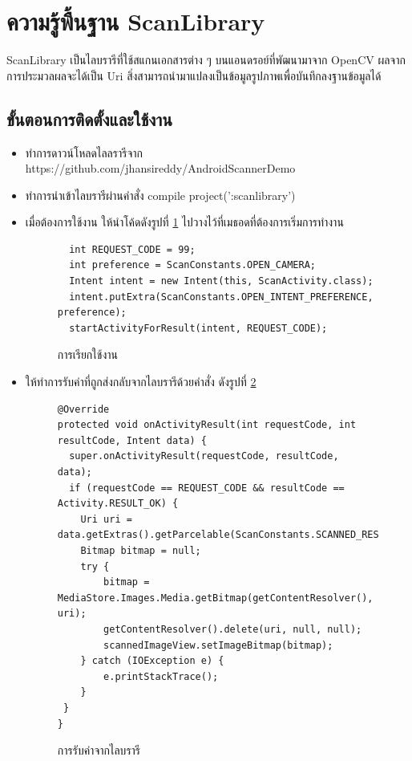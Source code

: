     \section{ความรู้พื้นฐาน ScanLibrary}
	    ScanLibrary \cite{ScanLibrary} เป็นไลบรารีที่ใช้สแกนเอกสารต่าง ๆ บนแอนดรอย์ที่พัฒนามาจาก OpenCV ผลจากการประมวลผลจะได้เป็น Uri สิ่งสามารถนำมาแปลงเป็นข้อมูลรูปภาพเพื่อบันทึกลงฐานข้อมูลได้
	    
	    \subsection{ขั้นตอนการติดตั้งและใช้งาน}
		   \begin{itemize}
			   	\item ทำการดาวน์โหลดไลลรารีจาก https://github.com/jhansireddy/AndroidScannerDemo
			   	\item ทำการนำเข้าไลบรารีผ่านคำสั่ง compile project(':scanlibrary')
			   	\item เมื่อต้องการใช้งาน ให้นำโค้ดดังรูปที่ \ref{Fig:use} ไปวางไว้ที่เมธอดที่ต้องการเริ่มการทำงาน
			   			\begin{figure}[H]
			   				{\begin{lstlisting}
  int REQUEST_CODE = 99;
  int preference = ScanConstants.OPEN_CAMERA;
  Intent intent = new Intent(this, ScanActivity.class);
  intent.putExtra(ScanConstants.OPEN_INTENT_PREFERENCE, preference);
  startActivityForResult(intent, REQUEST_CODE);
			   					\end{lstlisting}}
			   				\caption{การเรียกใช้งาน}
			   				\label{Fig:use}
			   			\end{figure}	
			   	\item ให้ทำการรับค่าที่ถูกส่งกลับจากไลบรารีด้วยคำสั่ง ดังรูปที่ \ref{Fig:use2}
  				   			\begin{figure}[H]
  				   				{\begin{lstlisting}
@Override
protected void onActivityResult(int requestCode, int resultCode, Intent data) {
  super.onActivityResult(requestCode, resultCode, data);
  if (requestCode == REQUEST_CODE && resultCode == Activity.RESULT_OK) {
	Uri uri = data.getExtras().getParcelable(ScanConstants.SCANNED_RESULT);
	Bitmap bitmap = null;
	try {
		bitmap = MediaStore.Images.Media.getBitmap(getContentResolver(), uri);
		getContentResolver().delete(uri, null, null);
		scannedImageView.setImageBitmap(bitmap);
	} catch (IOException e) {
		e.printStackTrace();
	}
 }
}
  				   					\end{lstlisting}}
  				   				\caption{การรับค่าจากไลบรารี}
  				   				\label{Fig:use2}
  				   			\end{figure}	
		   \end{itemize}
